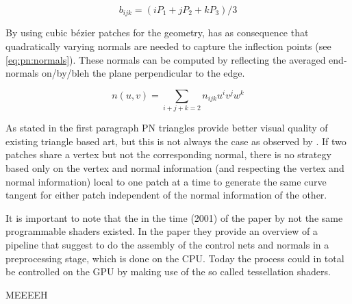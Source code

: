 \begin{equation}\label{eq:pn:spread}
	b_{ijk} = (iP_1 + jP_2 + kP_3) / 3
\end{equation}

By using cubic b\'ezier patches for the geometry, has as consequence that quadratically varying normals are needed to capture the inflection points (see \eqref{eq:pn:normals}). These normals can be computed by reflecting the averaged end-normals on/by/bleh the plane perpendicular to the edge.

\begin{equation}\label{eq:pn:normals}
	n(u,v) = \sum\limits_{i+j+k=2} n_{ijk} u^i v^j w^k
\end{equation}

As stated in the first paragraph PN triangles provide better visual quality of existing triangle based art, but this is not always the case as observed by \citeauthor{vlachos2001curved}. If two patches share a vertex but not the corresponding normal, there is no strategy based only on the vertex and normal information (and respecting the vertex and normal information) local to one patch at a time to generate the same curve tangent for either patch independent of the normal information of the other. 

It is important to note that the in the time (2001) of the paper by \citeauthor{vlachos2001curved} not the same programmable shaders existed. In the paper they provide an overview of a pipeline that suggest to do the assembly of the control nets and normals in a preprocessing stage, which is done on the CPU. Today the process could in total be controlled on the GPU by making use of the so called tessellation shaders.

MEEEEH
